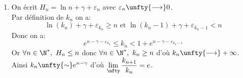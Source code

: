 \documentclass{book}
\begin{document}
\begin{enumerate}[leftmargin=*]
		Ainsi, $w_n\unfty{\sim}-\displaystyle\frac{1}{12n^2}$ puis:
		$$H_n\unfty{=}\ln n+\gamma+\displaystyle\frac{1}{2n}-\displaystyle\frac{1}{12n^2}+\smallo{\displaystyle\frac{1}{n^2}}$$
		\item On écrit $H_n=\ln n+\gamma + \varepsilon_n$ avec $\varepsilon_n\unfty{\longrightarrow} 0$.\\
		Par définition de $k_n$ on a:
		$$\ln(k_n)+\gamma +\varepsilon_{k_n}\geq n\text{ et }\ln(k_n-1)+\gamma +\varepsilon_{k_n-1}<n$$
		Donc on a:
		$$e^{n-\gamma-\varepsilon_{k_n}}\leq k_n< 1+e^{n-\gamma-\varepsilon_{k_n-1}}$$
		Or $\forall n\in \N^*,\ H_n\leq n$ donc $\forall n\in \N^*,\ k_n\geq n$ d'où $k_n\unfty{\longrightarrow}+\infty$.\\
		Ainsi $k_n\unfty{\sim} e^{n-\gamma}$ d'où $\lim\limits_{\nfty}\displaystyle\frac{k_{n+1}}{k_n}=e$.
	\end{enumerate}
	
\end{document}
